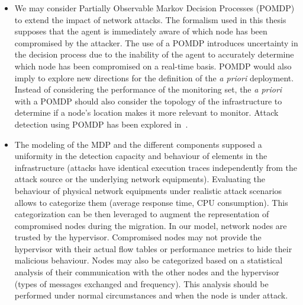 \begin{itemize}
    \item 
    We may consider Partially Observable Markov Decision Processes (POMDP) to extend the impact of network attacks.
    The formalism used in this thesis supposes that the agent is immediately aware of which node has been compromised by the attacker. The use of a POMDP introduces uncertainty in the decision process due to the inability of the agent to accurately determine which node has been compromised on a real-time basis. POMDP would also imply to explore new directions for the definition of the \textit{a priori} deployment. Instead of considering the performance of the monitoring set, the \textit{a priori} with a POMDP should also consider the topology of the infrastructure to determine if a node's location makes it more relevant to monitor. Attack detection using POMDP has been explored in~\cite{RL-POMDP}.
    
    \item 
    The modeling of the MDP and the different components supposed a uniformity in the detection capacity and behaviour of elements in the infrastructure (\eg attacks have identical execution traces independently from the attack source or the underlying network equipments). Evaluating the behaviour of physical network equipments under realistic attack scenarios allows to categorize them (\eg average response time, CPU consumption). This categorization can be then leveraged to augment the representation of compromised nodes during the migration. In our model, network nodes are trusted by the hypervisor. Compromised nodes may not provide the hypervisor with their actual flow tables or performance metrics to hide their malicious behaviour. Nodes may also be categorized based on a statistical analysis of their communication with the other nodes and the hypervisor (\eg types of messages exchanged and frequency). This analysis should be performed under normal circumstances and when the node is under attack.
    
\end{itemize}



